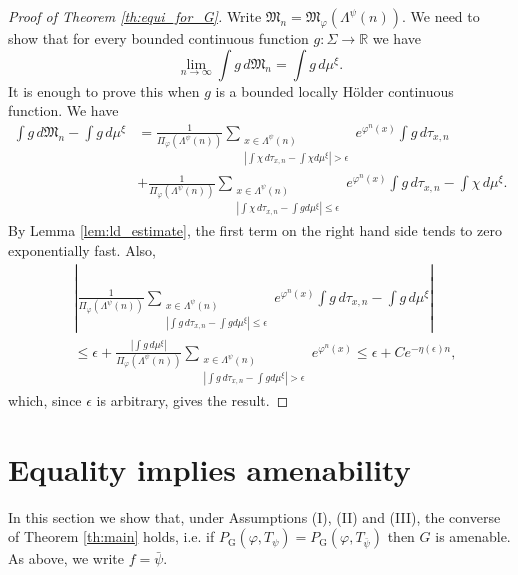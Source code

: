 \documentclass[11pt,letterpaper]{amsart}
\theoremstyle{definition}
\numberwithin{equation}{section}
\numberwithin{theorem}{section}
\def\R{\mathbb{R}}
\def\vp{\varphi}
\def\R{\mathbb R}
\def\PG{P_{\mathrm{G}}}
\begin{document}
\begin{proof}[Proof of Theorem \ref{th:equi_for_G}]
Write $\mathfrak M_n = \mathfrak M_\vp(\Lambda^\psi(n))$.
We need to show that for every bounded continuous function
$g : \Sigma \to \R$ we have
\[
\lim_{n \to \infty} \int g \, d\mathfrak M_n = \int g \, d\mu^\xi.
\]
It is enough to prove this when $g$ is a bounded locally H\"older continuous function.
We have
\begin{align*}
\int g \, d\mathfrak M_n - \int g \, d\mu^\xi 
&= \frac{1}{\Pi_\vp(\Lambda^\psi(n))}
\sum_{\substack{x \in \Lambda^\psi(n) \\ \left|\int \chi \, d\tau_{x,n} - \int \chi d\mu^\xi\right| > \epsilon}} 
e^{\vp^n(x)}
\int g \, d\tau_{x,n} 
\\
&+  \frac{1}{\Pi_\vp(\Lambda^\psi(n))}\sum_{\substack{x \in \Lambda^\psi(n) \\ \left|\int \chi \, d\tau_{x,n} - \int g d\mu^\xi\right| \le \epsilon}}  
e^{\vp^n(x)}
\int g \, d\tau_{x,n}-\int \chi \, d\mu^\xi.
\end{align*}
By Lemma \ref{lem:ld_estimate}, the first term on the right hand side tends to zero
exponentially fast. Also,
\begin{align*}
&\left|
\frac{1}{\Pi_\vp(\Lambda^\psi(n))}
\sum_{\substack{x \in \Lambda^\psi(n) \\ \left|\int g \, d\tau_{x,n} - \int g d\mu^\xi\right| \le \epsilon}} 
e^{\vp^n(x)}
\int g \, d\tau_{x,n}-\int g \, d\mu^\xi
\right|
\\
&\le
\epsilon + 
\frac{\left|\int g \, d\mu^\xi\right|}{\Pi_\vp(\Lambda^\psi(n))} 
\sum_{\substack{x \in \Lambda^\psi(n) \\ \left|\int g \, d\tau_{x,n} - \int g d\mu^\xi\right| > \epsilon}} 
e^{\vp^n(x)}
\le \epsilon + Ce^{-\eta(\epsilon)n},
\end{align*}
which, since $\epsilon$ is arbitrary, gives the result.

\end{proof}



\section{Equality implies amenability}\label{sec:eq imp am}

In this section we show that, under Assumptions (I), (II) and (III), the converse of Theorem 
\ref{th:main}
holds, i.e.
if $\PG(\vp,T_\psi)=\PG(\vp,T_{\bar \psi})$ then $G$ is 
amenable. As above, we write $f = \bar{\psi}$.
\end{document}
